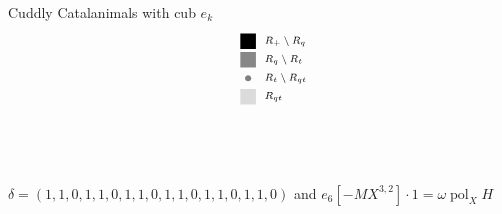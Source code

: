 \documentclass{beamer}
\DeclareMathOperator{\pol}{pol}
\newcommand{\mymidgray}{black!47}  %
\newcounter{c}
\begin{document}
\begin{frame}{Cuddly Catalanimals with cub \(e_k\)}
\[\begin{array}{c@{\quad\quad}cr}
    &\raisebox{16mm}{
\begin{tikzpicture}[scale = .39]
\begin{scope}
\draw[draw = none, fill = black!100] (2,-1) rectangle (3,-2);
\node[anchor = west] at (3,-1.5) {\scriptsize  \  $R_+ \setminus R_q$};
\end{scope}
\begin{scope}[yshift = -34*1]
\draw[draw = none, fill = \mymidgray] (2,-1) rectangle (3,-2);
\node[anchor = west] at (3,-1.5) {\scriptsize  \  $R_q \setminus R_t$};
\end{scope}
\begin{scope}[yshift = -34*2]
\draw[thin, black!0] (2,-1) -- (3,-1);
\draw[thin, black!0] (2,-1) -- (2,-2);
\draw[thin, black!0] (2,-2) -- (3,-2);
\draw[thin, black!0] (3,-2) -- (3,-1);
\draw[draw = none, fill = gray!100] (2+0.5, -1-0.5) circle (.2);
\node[anchor = west] at (3,-1.5) {\scriptsize  \  $R_t \setminus R_{qt}$};
\end{scope}
\begin{scope}[yshift = -34*3]
\draw[draw = none, fill = black!14] (2,-1) rectangle (3,-2);
\node[anchor = west] at (3,-1.5) {\scriptsize \  $R_{qt}$};
\end{scope}
\end{tikzpicture}}
  \end{array}
  \]
  \(\delta = (1,1,0,1,1,0,1,1,0,1,1,0,1,1,0,1,1,0)\) and
  \(e_6[-MX^{3,2}] \cdot 1 = \omega \pol_X H\)
\end{frame}
\end{document}

